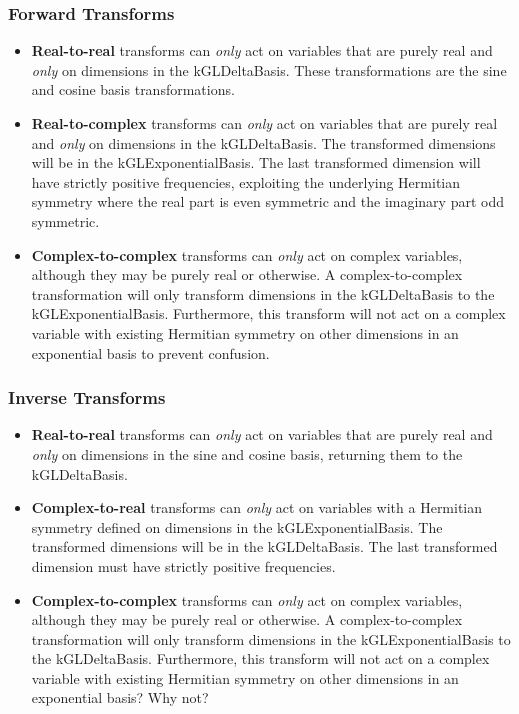 \documentclass[11pt]{article}
\begin{document}
\subsubsection{Forward Transforms}

\begin{itemize}
\item \textbf{Real-to-real} transforms can \emph{only} act on variables that are purely real and \emph{only} on dimensions in the kGLDeltaBasis. These transformations are the sine and cosine basis transformations.
\item \textbf{Real-to-complex} transforms can \emph{only} act on variables that are purely real and \emph{only} on dimensions in the kGLDeltaBasis. The transformed dimensions will be in the kGLExponentialBasis. The last transformed dimension will have strictly positive frequencies, exploiting the underlying Hermitian symmetry where the real part is even symmetric and the imaginary part odd symmetric.
\item \textbf{Complex-to-complex} transforms can \emph{only} act on complex variables, although they may be purely real or otherwise. A complex-to-complex transformation will only transform dimensions in the kGLDeltaBasis to the kGLExponentialBasis. Furthermore, this transform will not act on a complex variable with existing Hermitian symmetry on other dimensions in an exponential basis to prevent confusion.

\end{itemize}

\subsubsection{Inverse Transforms}

\begin{itemize}
\item \textbf{Real-to-real} transforms can \emph{only} act on variables that are purely real and \emph{only} on dimensions in the sine and cosine basis, returning them to the kGLDeltaBasis.
\item \textbf{Complex-to-real} transforms can \emph{only} act on variables with a Hermitian symmetry defined on dimensions in the kGLExponentialBasis. The transformed dimensions will be in the kGLDeltaBasis. The last transformed dimension must have strictly positive frequencies.
\item \textbf{Complex-to-complex} transforms can \emph{only} act on complex variables, although they may be purely real or otherwise. A complex-to-complex transformation will only transform dimensions in the kGLExponentialBasis to the kGLDeltaBasis. Furthermore, this transform will not act on a complex variable with existing Hermitian symmetry on other dimensions in an exponential basis? Why not?

\end{itemize}
\end{document}
